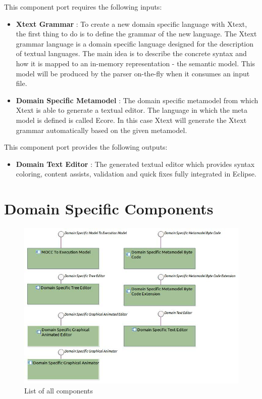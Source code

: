 \documentclass{gemoc} %
\begin{document}
This component port requires the following inputs:
\begin{itemize}
  \item \textbf{Xtext Grammar} :
To create a new domain specific language with Xtext, the first thing to do is to define the grammar of the new language. The Xtext grammar language is a domain specific language designed for the description of textual languages. The main idea is to describe the concrete syntax and how it is mapped to an in-memory representation - the semantic model. This model will be produced by the parser on-the-fly when it consumes an input file.
  \item \textbf{Domain Specific Metamodel} :
The domain specific metamodel from which Xtext is able to generate a textual editor. The language in which the meta model is defined is called Ecore. In this case Xtext will generate the Xtext grammar automatically based on the given metamodel.
\end{itemize}

This component port provides the following outputs:
\begin{itemize}
  \item \textbf{Domain Text Editor} :
The generated textual editor which provides syntax coloring, content assists, validation and quick fixes fully integrated in Eclipse.
\end{itemize}

\section{Domain Specific Components}
\begin{figure}[bt]
	\begin{center}
	\includegraphics*[trim=0.0cm 0.0cm 0cm 0.0cm, clip=true, width=1.0\linewidth]{../images/DomainSpecificComponents.jpg}
	\caption{List of all components}
	\label{fig:DomainSpecificComponentList}
	\end{center}
\end{figure}
\end{document}
